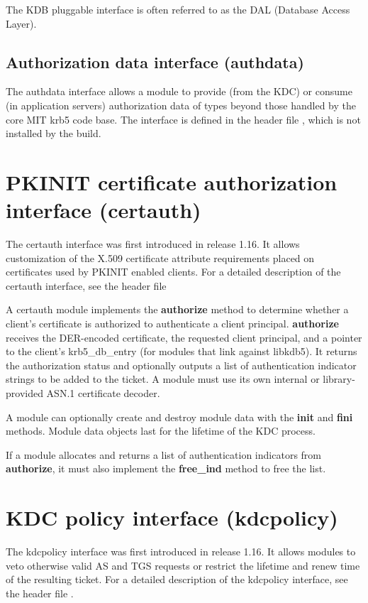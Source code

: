 \documentclass[letterpaper,10pt,english]{sphinxmanual}
\begin{document}
The KDB pluggable interface is often referred to as the DAL (Database
Access Layer).


\subsection{Authorization data interface (authdata)}
\label{plugindev/internal:authorization-data-interface-authdata}
The authdata interface allows a module to provide (from the KDC) or
consume (in application servers) authorization data of types beyond
those handled by the core MIT krb5 code base.  The interface is
defined in the header file , which is not
installed by the build.


\section{PKINIT certificate authorization interface (certauth)}
\label{plugindev/certauth:certauth-plugin}\label{plugindev/certauth::doc}\label{plugindev/certauth:pkinit-certificate-authorization-interface-certauth}
The certauth interface was first introduced in release 1.16.  It
allows customization of the X.509 certificate attribute requirements
placed on certificates used by PKINIT enabled clients.  For a detailed
description of the certauth interface, see the header file

A certauth module implements the \textbf{authorize} method to determine
whether a client's certificate is authorized to authenticate a client
principal.  \textbf{authorize} receives the DER-encoded certificate, the
requested client principal, and a pointer to the client's
krb5\_db\_entry (for modules that link against libkdb5).  It returns the
authorization status and optionally outputs a list of authentication
indicator strings to be added to the ticket.  A module must use its
own internal or library-provided ASN.1 certificate decoder.

A module can optionally create and destroy module data with the
\textbf{init} and \textbf{fini} methods.  Module data objects last for the
lifetime of the KDC process.

If a module allocates and returns a list of authentication indicators
from \textbf{authorize}, it must also implement the \textbf{free\_ind} method
to free the list.


\section{KDC policy interface (kdcpolicy)}
\label{plugindev/kdcpolicy:kdcpolicy-plugin}\label{plugindev/kdcpolicy::doc}\label{plugindev/kdcpolicy:kdc-policy-interface-kdcpolicy}
The kdcpolicy interface was first introduced in release 1.16.  It
allows modules to veto otherwise valid AS and TGS requests or restrict
the lifetime and renew time of the resulting ticket.  For a detailed
description of the kdcpolicy interface, see the header file
.
\end{document}
